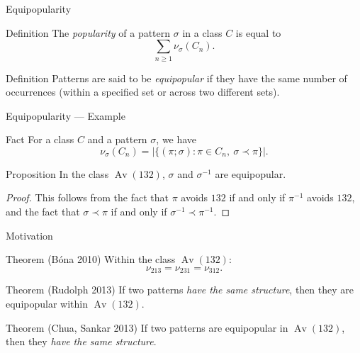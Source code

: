 \documentclass[xcolor=table,dvipsnames]{beamer}
\DeclareMathOperator{\Av}{Av}
\newcommand{\num}{\nu}
\begin{document}
\begin{frame}{Equipopularity}
  \begin{block}{Definition}
    The \emph{popularity} of a pattern $\sigma$ in a class $C$ is equal to 
    $$ \sum_{n\geq 1} \num_\sigma (C_n). $$
  \end{block}

  \begin{block}{Definition}
    Patterns are said to be \emph{equipopular} if they have the same number 
    of occurrences (within a specified set or across two different sets). 
  \end{block}
\end{frame}

\begin{frame}{Equipopularity --- Example}
  \begin{block}{Fact}
    For a class $C$ and a pattern $\sigma$, we have 
    $$ \num_\sigma(C_n) = 
      |\{ (\pi; \sigma) : \pi \in C_n,\ \sigma \prec \pi\}|.$$
  \end{block}
  \pause

  \begin{block}{Proposition}
    In the class $\Av(132)$, $\sigma$ and $\sigma^{-1}$ are equipopular.
  \end{block}
  \begin{proof}
    This follows from the fact that $\pi$ avoids $132$ if and only if $\pi^{-1}$ 
    avoids $132$, and the fact that $\sigma \prec \pi$ if and only if 
    $\sigma^{-1} \prec \pi^{-1}$. 
  \end{proof}
\end{frame}




\begin{frame}{Motivation}
  \pause
  \begin{block}{Theorem (B\'ona 2010)}
    Within the class $\Av(132)$:
    $$\num_{213} = \num_{231} = \num_{312}.$$
  \end{block}
  \pause
  \begin{block}{Theorem (Rudolph 2013)}
    If two patterns \emph{have the same structure}, then they
    are equipopular within $\Av(132)$. 
  \end{block}
  \pause
  \begin{block}{Theorem (Chua, Sankar 2013)}
    If two patterns are equipopular in $\Av(132)$, then they \emph{have the same
    structure}. 
  \end{block}
\end{frame}
\end{document}
